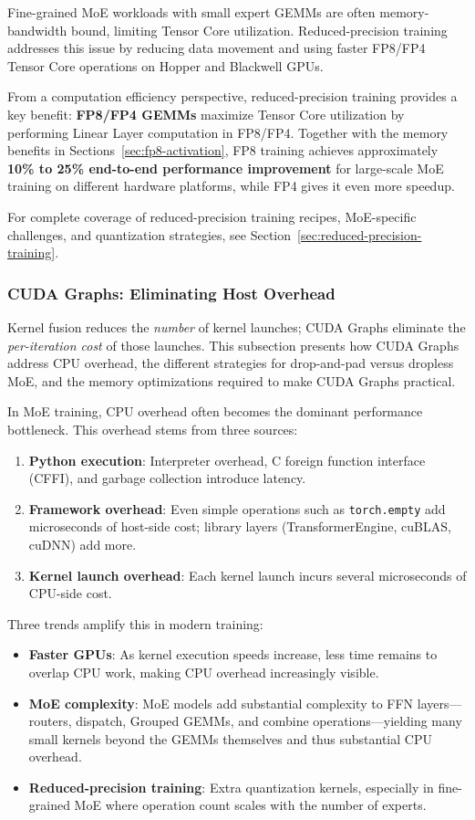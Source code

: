 \documentclass[10pt,logo,copyright]{nvidiatechreport}
\begin{document}
Fine-grained MoE workloads with small expert GEMMs are often memory-bandwidth bound, limiting Tensor Core utilization. Reduced-precision training addresses this issue by reducing data movement and using faster FP8/FP4 Tensor Core operations on Hopper and Blackwell GPUs.

From a computation efficiency perspective, reduced-precision training provides a key benefit: \textbf{FP8/FP4 GEMMs} maximize Tensor Core utilization by performing Linear Layer computation in FP8/FP4. Together with the memory benefits in Sections~\ref{sec:fp8-activation}, FP8 training achieves approximately \textbf{10\% to 25\% end-to-end performance improvement} for large-scale MoE training on different hardware platforms, while FP4 gives it even more speedup.

For complete coverage of reduced-precision training recipes, MoE-specific challenges, and quantization strategies, see Section~\ref{sec:reduced-precision-training}.

\subsubsection{CUDA Graphs: Eliminating Host Overhead}\label{sec:cuda-graphs}

Kernel fusion reduces the \emph{number} of kernel launches; CUDA Graphs eliminate the \emph{per-iteration cost} of those launches. This subsection presents how CUDA Graphs address CPU overhead, the different strategies for drop-and-pad versus dropless MoE, and the memory optimizations required to make CUDA Graphs practical.

In MoE training, CPU overhead often becomes the dominant performance bottleneck. This overhead stems from three sources:
\begin{enumerate}
    \item \textbf{Python execution}: Interpreter overhead, C foreign function interface (CFFI), and garbage collection introduce latency.
    \item \textbf{Framework overhead}: Even simple operations such as \texttt{torch.empty} add microseconds of host-side cost; library layers (TransformerEngine, cuBLAS, cuDNN) add more.
    \item \textbf{Kernel launch overhead}: Each kernel launch incurs several microseconds of CPU-side cost.
\end{enumerate}

Three trends amplify this in modern training:
\begin{itemize}
    \item \textbf{Faster GPUs}: As kernel execution speeds increase, less time remains to overlap CPU work, making CPU overhead increasingly visible.
    \item \textbf{MoE complexity}: MoE models add substantial complexity to FFN layers---routers, dispatch, Grouped GEMMs, and combine operations---yielding many small kernels beyond the GEMMs themselves and thus substantial CPU overhead.
    \item \textbf{Reduced-precision training}: Extra quantization kernels, especially in fine-grained MoE where operation count scales with the number of experts.
\end{itemize}
\end{document}
